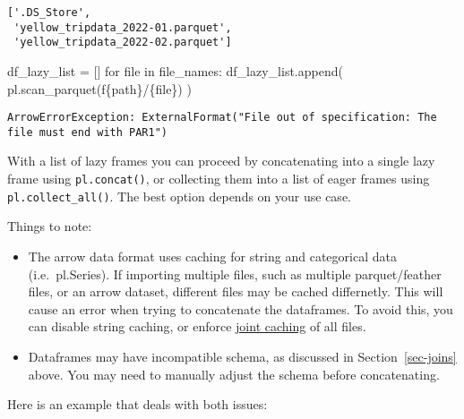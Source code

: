 \documentclass[
  letterpaper,
  DIV=11,
  numbers=noendperiod]{scrartcl}
\newenvironment{Shaded}{\begin{snugshade}}{\end{snugshade}}
\newcommand{\BuiltInTok}[1]{\textcolor[rgb]{0.00,0.23,0.31}{#1}}
\newcommand{\ControlFlowTok}[1]{\textcolor[rgb]{0.00,0.23,0.31}{#1}}
\newcommand{\KeywordTok}[1]{\textcolor[rgb]{0.00,0.23,0.31}{#1}}
\newcommand{\NormalTok}[1]{\textcolor[rgb]{0.00,0.23,0.31}{#1}}
\newcommand{\OperatorTok}[1]{\textcolor[rgb]{0.37,0.37,0.37}{#1}}
\newcommand{\SpecialCharTok}[1]{\textcolor[rgb]{0.37,0.37,0.37}{#1}}
\newcommand{\SpecialStringTok}[1]{\textcolor[rgb]{0.13,0.47,0.30}{#1}}
\providecommand{\tightlist}{%
  \setlength{\itemsep}{0pt}\setlength{\parskip}{0pt}}\usepackage{longtable,booktabs,array}
\begin{document}
\begin{verbatim}
['.DS_Store',
 'yellow_tripdata_2022-01.parquet',
 'yellow_tripdata_2022-02.parquet']
\end{verbatim}

\begin{Shaded}
\begin{Highlighting}[]
\NormalTok{df\_lazy\_list }\OperatorTok{=}\NormalTok{ []}
\ControlFlowTok{for} \BuiltInTok{file} \KeywordTok{in}\NormalTok{ file\_names:}
\NormalTok{    df\_lazy\_list.append(}
\NormalTok{        pl.scan\_parquet(}\SpecialStringTok{f\textquotesingle{}}\SpecialCharTok{\{}\NormalTok{path}\SpecialCharTok{\}}\SpecialStringTok{/}\SpecialCharTok{\{}\BuiltInTok{file}\SpecialCharTok{\}}\SpecialStringTok{\textquotesingle{}}\NormalTok{)}
\NormalTok{        )}
\end{Highlighting}
\end{Shaded}

\begin{verbatim}
ArrowErrorException: ExternalFormat("File out of specification: The file must end with PAR1")
\end{verbatim}

With a list of lazy frames you can proceed by concatenating into a
single lazy frame using \texttt{pl.concat()}, or collecting them into a
list of eager frames using \texttt{pl.collect\_all()}. The best option
depends on your use case.

Things to note:

\begin{itemize}
\tightlist
\item
  The arrow data format uses caching for string and categorical data
  (i.e.~pl.Series). If importing multiple files, such as multiple
  parquet/feather files, or an arrow dataset, different files may be
  cached differnetly. This will cause an error when trying to
  concatenate the dataframes. To avoid this, you can disable string
  caching, or enforce
  \href{https://pola-rs.github.io/polars/py-polars/html/reference/api/polars.StringCache.html}{joint
  caching} of all files.
\item
  Dataframes may have incompatible schema, as discussed in
  Section~\ref{sec-joins} above. You may need to manually adjust the
  schema before concatenating.
\end{itemize}

Here is an example that deals with both issues:
\end{document}
